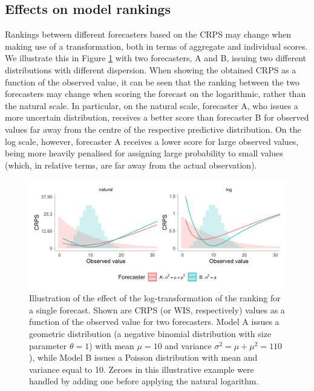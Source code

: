 \documentclass{article}
\begin{document}
\subsection{Effects on model rankings}
\label{sec:methods:rankings}
Rankings between different forecasters based on the CRPS may change when making use of a transformation, both in terms of aggregate and individual scores. We illustrate this in Figure \ref{fig:illustration-ranking} with two forecasters, A and B, issuing two different distributions with different dispersion. When showing the obtained CRPS as a function of the observed value, it can be seen that the ranking between the two forecasters may change when scoring the forecast on the logarithmic, rather than the natural scale. In particular, on the natural scale, forecaster A, who issues a more uncertain distribution, receives a better score than forecaster B for observed values far away from the centre of the respective predictive distribution. On the log scale, however, forecaster A receives a lower score for large observed values, being more heavily penalised for assigning large probability to small values (which, in relative terms, are far away from the actual observation). 


\begin{figure}[h!]
\centering
\includegraphics[width = 1\textwidth]{output/figures/illustration-effect-log-ranking-crps.png}
\caption{Illustration of the effect of the log-transformation of the ranking for a single forecast. Shown are CRPS (or WIS, respectively) values as a function of the observed value for two forecasters. Model A issues a geometric distribution (a negative binomial distribution with size parameter $\theta = 1$) with mean $\mu = 10$ and variance $\sigma^2 = \mu + \mu^2 = 110$), while Model B issues a Poisson distribution with mean and variance equal to 10. Zeroes in this illustrative example were handled by adding one before applying the natural logarithm.}
\label{fig:illustration-ranking}
\end{figure}
\end{document}
